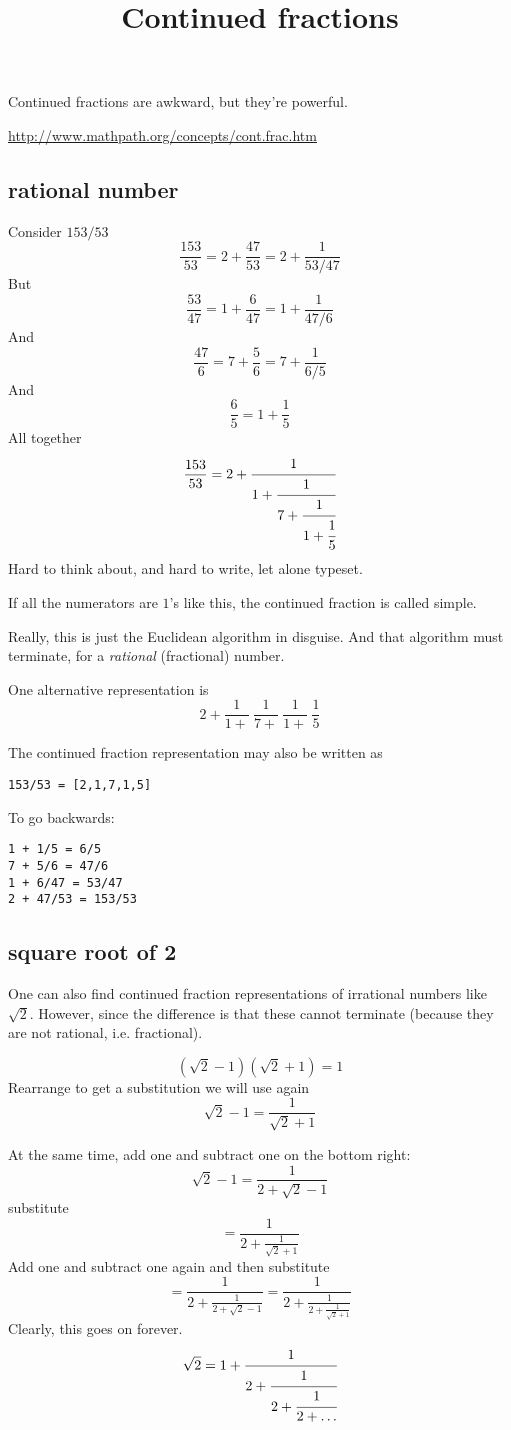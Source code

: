 \documentclass[11pt, oneside]{article}
\title{Continued fractions}
\date{}
\begin{document}
\maketitle
\Large
Continued fractions are awkward, but they're powerful.

\url{http://www.mathpath.org/concepts/cont.frac.htm}

\subsection*{rational number}
Consider $153/53$
\[ \frac{153}{53} = 2 + \frac{47}{53} = 2 + \frac{1}{53/47} \]
But
\[ \frac{53}{47} = 1 + \frac{6}{47} = 1 + \frac{1}{47/6}  \]
And
\[ \frac{47}{6} = 7 + \frac{5}{6} = 7 + \frac{1}{6/5}  \] 
And
\[ \frac{6}{5} = 1 + \frac{1}{5} \] 
All together
\[ \frac{153}{53} = 2 + \cfrac{1}{1 + \cfrac{1}{7 + \cfrac{1}{1 + \cfrac{1}{5}}}} \]
Hard to think about, and hard to write, let alone typeset.  

If all the numerators are $1$'s like this, the continued fraction is called simple.

Really, this is just the Euclidean algorithm in disguise.  And that algorithm must terminate, for a \emph{rational} (fractional) number.

One alternative representation is
\[ 2 + \frac{1}{1+} \ \frac{1}{7+} \ \frac{1}{1+} \ \frac{1}{5} \]

The continued fraction representation may also be written as
\begin{verbatim}
153/53 = [2,1,7,1,5]
\end{verbatim}

To go backwards:
\begin{verbatim}
1 + 1/5 = 6/5
7 + 5/6 = 47/6
1 + 6/47 = 53/47
2 + 47/53 = 153/53
\end{verbatim}

\subsection*{square root of 2}
One can also find continued fraction representations of irrational numbers like $\sqrt{2}$.  However, since the difference is that these cannot terminate (because they are not rational, i.e. fractional).

\[ (\sqrt{2} - 1)(\sqrt{2} + 1) = 1 \]
Rearrange to get a substitution we will use again
\[ \sqrt{2} - 1 = \frac{1}{\sqrt{2} + 1} \]

At the same time, add one and subtract one on the bottom right:
\[ \sqrt{2} - 1 =  \frac{1}{2 + \sqrt{2} - 1} \]
substitute
\[ = \frac{1}{2 + \frac{1}{\sqrt{2} + 1}} \]
Add one and subtract one again and then substitute
\[ = \frac{1}{2 + \frac{1}{2 + \sqrt{2} - 1}} = \frac{1}{2 + \frac{1}{2 + \frac{1}{\sqrt{2} + 1} }} \]
Clearly, this goes on forever.
\[ \sqrt{2} = 1 + \cfrac{1}{2+\cfrac{1}{2+\cfrac{1}{2 + \dots}}}  \]
\end{document}
